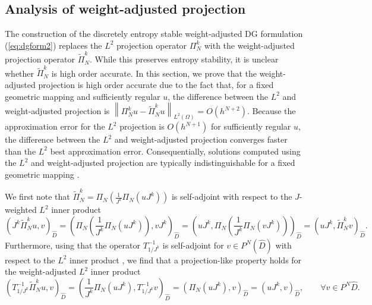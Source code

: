 \documentclass[preprint,10pt]{article}
\theoremstyle{definition}
\theoremstyle{lemma}
\theoremstyle{theorem}
\theoremstyle{assumption}
\renewcommand{\hat}{\widehat}
\renewcommand{\tilde}{\widetilde}
\newcommand{\nor}[1]{\left\| #1 \right\|}
\newcommand{\LRp}[1]{\left( #1 \right)}
\begin{document}
{\subsection{Analysis of weight-adjusted projection} 

The construction of the discretely entropy stable weight-adjusted DG formulation (\ref{eq:dgform2}) replaces the $L^2$ projection operator $\Pi_N^k$ with the weight-adjusted projection operator $\tilde{\Pi}^k_N$.
While this preserves entropy stability, it is unclear whether $\tilde{\Pi}^k_N$ is high order accurate.  In this section, we prove that the weight-adjusted projection is high order accurate due to the fact that, for a fixed geometric mapping and sufficiently regular $u$, the difference between the $L^2$ and weight-adjusted projection is $\nor{\Pi_N^k u - \tilde{\Pi}^k_N  u}_{L^2\LRp{\Omega}} = O(h^{N+2})$.  Because the approximation error for the $L^2$ projection is $O(h^{N+1})$ for sufficiently regular $u$, the difference between the $L^2$ and weight-adjusted projection converges faster than the $L^2$ best approximation error.  Consequentially, solutions computed using the $L^2$ and weight-adjusted projection are typically indistinguishable for a fixed geometric mapping \cite{chan2018multi}.  

We first note that $\tilde{\Pi}^k_N  = \Pi_N\LRp{\frac{1}{J^k}\Pi_N\LRp{uJ^k}}$ is self-adjoint with respect to the $J$-weighted $L^2$ inner product
\begin{equation}
  \LRp{J^k \tilde{\Pi}^k_N  u, v}_{\hat{D}} = \LRp{\Pi_N\LRp{\frac{1}{J^k}\Pi_N\LRp{uJ^k}}, vJ^k}_{\hat{D}} = \LRp{uJ^k, \Pi_N\LRp{\frac{1}{J^k}\Pi_N\LRp{vJ^k}}}_{\hat{D}} =  \LRp{uJ^k, \tilde{\Pi}^k_N  v}_{\hat{D}}.
\label{eq:PNsym}
\end{equation}
Furthermore, using that the operator $T_{1/J^k}^{-1}$ is self-adjoint for $v \in P^N\LRp{\hat{D}}$ with respect to the $L^2$ inner product \cite{chan2016weight1}, we find that a projection-like property holds for the weight-adjusted $L^2$ inner product
\begin{equation}
  \LRp{T_{1/J^k}^{-1} \tilde{\Pi}^k_N  u,v}_{\hat{D}} = \LRp{ \frac{1}{J^k}\Pi_N(uJ^k),T_{1/J^k}^{-1}v}_{\hat{D}} = \LRp{\Pi_N(u J^k),v}_{\hat{D}} = \LRp{u J^k,v}_{\hat{D}}, \qquad \forall v\in P^N{\hat{D}}.
\label{eq:PNproj}
\end{equation}

}
\end{document}
